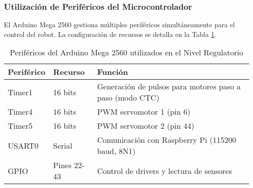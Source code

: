 \subsubsection{Utilización de Periféricos del Microcontrolador}

El Arduino Mega 2560 gestiona múltiples periféricos simultáneamente para el control del robot. La configuración de recursos se detalla en la Tabla \ref{tab:perifericos_regulatorio}.

\begin{table}[H]
\centering
\begin{tabular}{|l|l|p{6cm}|}
\hline
\textbf{Periférico} & \textbf{Recurso} & \textbf{Función} \\
\hline
Timer1 & 16 bits & Generación de pulsos para motores paso a paso (modo CTC) \\
\hline
Timer4 & 16 bits & PWM servomotor 1 (pin 6) \\
\hline
Timer5 & 16 bits & PWM servomotor 2 (pin 44) \\
\hline
USART0 & Serial & Comunicación con Raspberry Pi (115200 baud, 8N1) \\
\hline
GPIO & Pines 22-43 & Control de drivers y lectura de sensores \\
\hline
\end{tabular}
\caption{Periféricos del Arduino Mega 2560 utilizados en el Nivel Regulatorio}
\label{tab:perifericos_regulatorio}
\end{table}